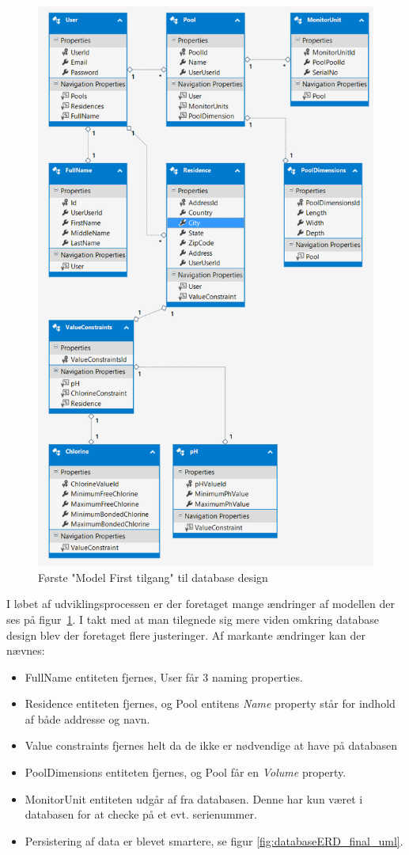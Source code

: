\begin{figure}[h]
	\centering
	\includegraphics[width=0.8\linewidth]{figs/design/databaseERD}
	\caption{Første "Model First tilgang" til database design}
	\label{fig:databaseERD_firstattempt_uml}
\end{figure}

I løbet af udviklingsprocessen er der foretaget mange ændringer af modellen der ses på figur~\ref{fig:databaseERD_firstattempt_uml}. 
I takt med at man tilegnede sig mere viden omkring database design blev der foretaget flere justeringer. Af markante ændringer kan der nævnes:

\begin{itemize}
	\item FullName entiteten fjernes, User får 3 naming properties.
	\item Residence entiteten fjernes, og Pool entitens \textit{Name} property står for indhold af både addresse og navn.
	\item Value constraints fjernes helt da de ikke er nødvendige at have på databasen
	\item PoolDimensions entiteten fjernes, og Pool får en \textit{Volume} property.
	\item MonitorUnit entiteten udgår af fra databasen. Denne har kun været i databasen for at checke på et evt. serienummer.
	\item Persistering af data er blevet smartere, se figur \ref{fig:databaseERD_final_uml}.
\end{itemize}

